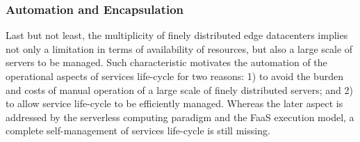 	
\subsubsection{Automation and Encapsulation}


Last but not least, the multiplicity of finely distributed edge datacenters implies not only a limitation in terms of availability of resources, but also a large scale of servers to be managed. Such characteristic motivates the automation of the operational aspects of services life-cycle for two reasons: 1) to avoid the burden and costs of manual operation of a large scale of finely distributed servers; and 2) to allow service life-cycle to be efficiently managed. Whereas the later aspect is addressed by the serverless computing paradigm and the FaaS execution model, a complete self-management of services life-cycle is still missing.









